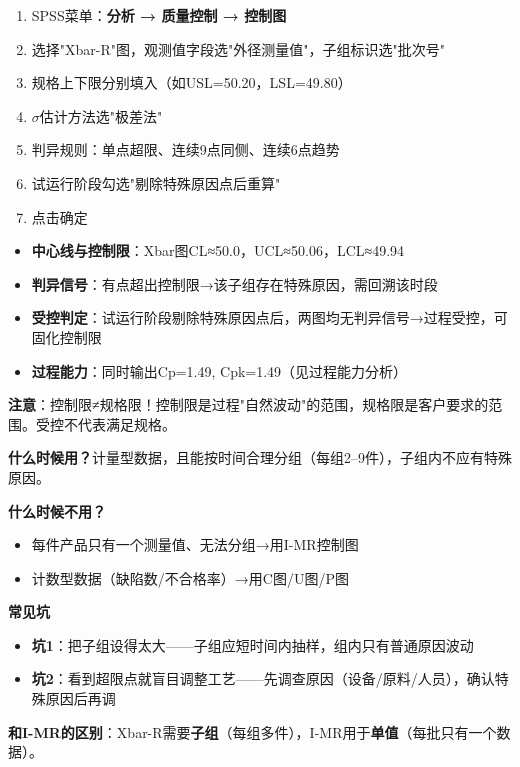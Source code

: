 \begin{algosposs}
\begin{enumerate}
    \item SPSS菜单：\textbf{分析 → 质量控制 → 控制图}
    \item 选择"Xbar-R"图，观测值字段选"外径测量值"，子组标识选"批次号"
    \item 规格上下限分别填入（如USL=50.20，LSL=49.80）
    \item $\sigma$估计方法选"极差法"
    \item 判异规则：单点超限、连续9点同侧、连续6点趋势
    \item 试运行阶段勾选"剔除特殊原因点后重算"
    \item 点击确定
\end{enumerate}
\end{algosposs}

\begin{algoresult}
\begin{itemize}
    \item \textbf{中心线与控制限}：Xbar图CL≈50.0，UCL≈50.06，LCL≈49.94
    \item \textbf{判异信号}：有点超出控制限→该子组存在特殊原因，需回溯该时段
    \item \textbf{受控判定}：试运行阶段剔除特殊原因点后，两图均无判异信号→过程受控，可固化控制限
    \item \textbf{过程能力}：同时输出Cp=1.49, Cpk=1.49（见过程能力分析）
\end{itemize}

\textbf{注意}：控制限≠规格限！控制限是过程"自然波动"的范围，规格限是客户要求的范围。受控不代表满足规格。
\end{algoresult}

\begin{algonotes}
\textbf{什么时候用？}计量型数据，且能按时间合理分组（每组2--9件），子组内不应有特殊原因。

\textbf{什么时候不用？}
\begin{itemize}
    \item 每件产品只有一个测量值、无法分组→用I-MR控制图
    \item 计数型数据（缺陷数/不合格率）→用C图/U图/P图
\end{itemize}

\textbf{常见坑}
\begin{itemize}
    \item \textbf{坑1}：把子组设得太大——子组应短时间内抽样，组内只有普通原因波动
    \item \textbf{坑2}：看到超限点就盲目调整工艺——先调查原因（设备/原料/人员），确认特殊原因后再调
\end{itemize}

\textbf{和I-MR的区别}：Xbar-R需要\textbf{子组}（每组多件），I-MR用于\textbf{单值}（每批只有一个数据）。
\end{algonotes}

